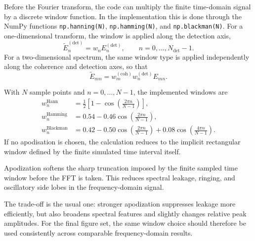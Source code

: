 Before the Fourier transform, the code can multiply the finite time-domain
signal by a discrete window function. In the implementation this is done
through the NumPy functions \texttt{np.hanning(N)},
\texttt{np.hamming(N)}, and \texttt{np.blackman(N)}. For a one-dimensional
transform, the window is applied along the detection axis,
\[
\tilde{E}_{n}^{(\mathrm{det})}
=
w_n E_{n}^{(\mathrm{det})},
\qquad
n=0,\dots,N_{\mathrm{det}}-1.
\]
For a two-dimensional spectrum, the same window type is applied independently
along the coherence and detection axes, so that
\[
\tilde{E}_{mn}
=
w_m^{(\mathrm{coh})} w_n^{(\mathrm{det})} E_{mn}.
\]

With \(N\) sample points and \(n=0,\dots,N-1\), the implemented windows are
\begin{align*}
w_n^{\mathrm{Hann}}
&=
\frac{1}{2}\left[
1-\cos\!\left(\frac{2\pi n}{N-1}\right)
\right],
\\
w_n^{\mathrm{Hamming}}
&=
0.54-0.46\cos\!\left(\frac{2\pi n}{N-1}\right),
\\
w_n^{\mathrm{Blackman}}
&=
0.42-0.50\cos\!\left(\frac{2\pi n}{N-1}\right)
+0.08\cos\!\left(\frac{4\pi n}{N-1}\right).
\end{align*}
If no apodisation is chosen, the calculation reduces to the implicit
rectangular window defined by the finite simulated time interval itself.

Apodization softens the sharp truncation imposed by the finite sampled time
window before the FFT is taken. This reduces spectral leakage, ringing, and
oscillatory side lobes in the frequency-domain signal.

The trade-off is the usual one: stronger apodization suppresses leakage more
efficiently, but also broadens spectral features and slightly changes relative
peak amplitudes. For the final figure set, the same window choice should
therefore be used consistently across comparable frequency-domain results.
